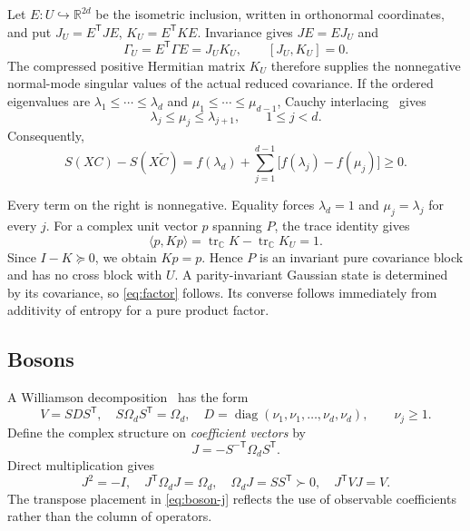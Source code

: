 \documentclass[11pt,a4paper]{article}
\numberwithin{equation}{section}
\theoremstyle{remark}
\newcommand{\R}{\mathbb R}
\newcommand{\C}{\mathbb C}
\newcommand{\T}{\mathsf T}
\newcommand{\tr}{\operatorname{tr}}
\newcommand{\diag}{\operatorname{diag}}
\begin{document}
Let $E:U\hookrightarrow\R^{2d}$ be the isometric inclusion, written in orthonormal coordinates, and put $J_U=E^{\T}JE$, $K_U=E^{\T}KE$. Invariance gives $JE=EJ_U$ and
\begin{equation}\label{eq:fermion-compression-matrix}
 \Gamma_U=E^{\T}\Gamma E=J_UK_U,\qquad [J_U,K_U]=0.
\end{equation}
The compressed positive Hermitian matrix $K_U$ therefore supplies the nonnegative normal-mode singular values of the actual reduced covariance. If the ordered eigenvalues are $\lambda_1\le\cdots\le\lambda_d$ and $\mu_1\le\cdots\le\mu_{d-1}$, Cauchy interlacing~\cite{HornJohnson2013} gives
\begin{equation}\label{eq:interlacing-f}
 \lambda_j\le\mu_j\le\lambda_{j+1},\qquad 1\le j<d.
\end{equation}
Consequently,
\begin{equation}\label{eq:fermion-difference}
 S(XC)-S(X\widetilde C)
 =f(\lambda_d)+\sum_{j=1}^{d-1}\bigl[f(\lambda_j)-f(\mu_j)\bigr]\ge0.
\end{equation}

Every term on the right is nonnegative. Equality forces $\lambda_d=1$ and $\mu_j=\lambda_j$ for every $j$. For a complex unit vector $p$ spanning $P$, the trace identity gives
\begin{equation}\label{eq:fermion-equality}
 \langle p,Kp\rangle=\tr_{\C}K-\tr_{\C}K_U=1.
\end{equation}
Since $I-K\succeq0$, we obtain $Kp=p$. Hence $P$ is an invariant pure covariance block and has no cross block with $U$. A parity-invariant Gaussian state is determined by its covariance, so \eqref{eq:factor} follows. Its converse follows immediately from additivity of entropy for a pure product factor.

\subsection{Bosons}
A Williamson decomposition~\cite{Williamson1936} has the form
\begin{equation}\label{eq:williamson}
 V=SDS^{\T},\quad S\Omega_d S^{\T}=\Omega_d,\quad
 D=\diag(\nu_1,\nu_1,\ldots,\nu_d,\nu_d),\qquad \nu_j\ge1.
\end{equation}
Define the complex structure on \emph{coefficient vectors} by
\begin{equation}\label{eq:boson-j}
 J=-S^{-\T}\Omega_d S^{\T}.
\end{equation}
Direct multiplication gives
\begin{equation}\label{eq:boson-compatible}
 J^2=-I,\quad J^{\T}\Omega_dJ=\Omega_d,\quad
 \Omega_dJ=SS^{\T}\succ0,\quad J^{\T}VJ=V.
\end{equation}
The transpose placement in \eqref{eq:boson-j} reflects the use of observable coefficients rather than the column of operators.
\end{document}
